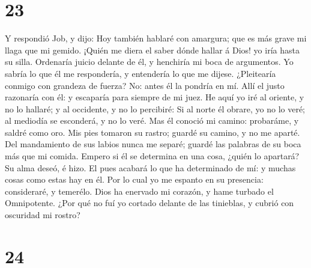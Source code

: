 \hypertarget{section-22}{%
\section{23}\label{section-22}}

 Y respondió Job, y dijo:  Hoy también hablaré
con amargura; que es más grave mi llaga que mi gemido. 
¡Quién me diera el saber dónde hallar á Dios! yo iría hasta su silla.
 Ordenaría juicio delante de él, y henchiría mi boca de
argumentos.  Yo sabría lo que él me respondería, y
entendería lo que me dijese.  ¿Pleitearía conmigo con
grandeza de fuerza? No: antes él la pondría en mí.  Allí el
justo razonaría con él: y escaparía para siempre de mi juez.
 He aquí yo iré al oriente, y no lo hallaré; y al occidente,
y no lo percibiré:  Si al norte él obrare, yo no lo veré; al
mediodía se esconderá, y no lo veré.  Mas él conoció mi
camino: probaráme, y saldré como oro.  Mis pies tomaron su
rastro; guardé su camino, y no me aparté.  Del mandamiento
de sus labios nunca me separé; guardé las palabras de su boca más que mi
comida.  Empero si él se determina en una cosa, ¿quién lo
apartará? Su alma deseó, é hizo.  El pues acabará lo que ha
determinado de mí: y muchas cosas como estas hay en él. 
Por lo cual yo me espanto en su presencia: consideraré, y temerélo.
 Dios ha enervado mi corazón, y hame turbado el
Omnipotente.  ¿Por qué no fuí yo cortado delante de las
tinieblas, y cubrió con oscuridad mi rostro?

\hypertarget{section-23}{%
\section{24}\label{section-23}}

